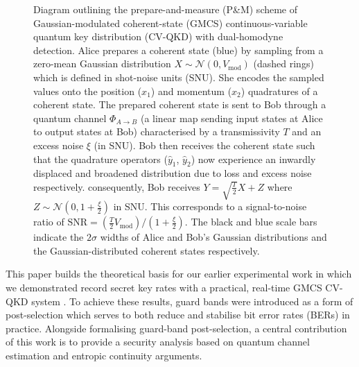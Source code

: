 ﻿\documentclass[12pt]{article}
\begin{document}
\begin{figure}[t]
\endgroup
\caption{
Diagram outlining the prepare-and-measure (P\&M) scheme of Gaussian-modulated coherent-state (GMCS) continuous-variable quantum key distribution (CV-QKD) with dual-homodyne detection. Alice prepares a coherent state (blue) by sampling from a zero-mean Gaussian distribution $X \sim \mathcal{N}(0, V_\text{mod})$ (dashed rings) which is defined in  shot-noise units (SNU). She encodes the sampled values onto the position ($x_1$) and momentum ($x_2$) quadratures of a coherent state. The prepared coherent state is sent to Bob through a quantum channel $\Phi_{A\rightarrow B}$ (a linear map sending input states at Alice to output states at Bob) characterised by a transmissivity $T$ and an excess noise $\xi$ (in SNU). Bob then receives the coherent state such that the quadrature operators ($\hat{y}_1$, $\hat{y}_2$) now experience an inwardly displaced and broadened distribution due to loss and excess noise respectively. consequently, Bob receives $Y = \sqrt{\frac{T}{2}}X + Z$ where $Z \sim \mathcal{N}(0, 1 + \frac{\xi}{2})$ in SNU. This corresponds to a signal-to-noise ratio of $\text{SNR} = (\frac{T}{2} V_\text{mod}) / (1+\frac{\xi}{2})$. The black and blue scale bars indicate the $2\sigma$ widths of Alice and Bob's Gaussian distributions and the Gaussian-distributed coherent states respectively.}
\label{fig: modulation schematic}
\end{figure}

This paper builds the theoretical basis for our earlier experimental work in which we demonstrated record secret key rates with a practical, real-time GMCS CV-QKD system \cite{Weerasinghe-2023}. To achieve these results, guard bands were introduced as a form of post-selection which serves to both reduce and stabilise bit error rates (BERs) in practice.  Alongside formalising guard-band post-selection, a central contribution of this work is to provide a security analysis based on quantum channel estimation and entropic continuity arguments.
\end{document}
